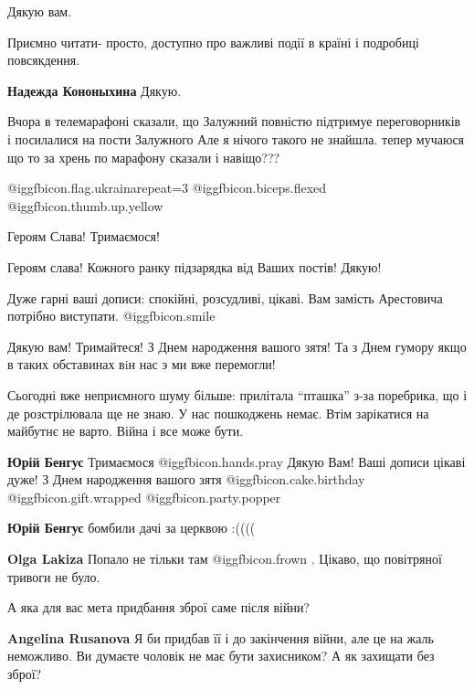 
 
 
 
 
\zzSecCmt

\begin{itemize} %
Дякую вам.

Приємно читати- просто, доступно про важливі події в країні і подробиці повсякдення.

\textbf{Надежда Кононыхина} Дякую.


Вчора в телемарафоні сказали, що Залужний повністю підтримуе переговорників і
посилалися на пости Залужного Але я нічого такого не знайшла. тепер мучаюся що
то за хрень по марафону сказали і навіщо???

@igg{fbicon.flag.ukraina}{repeat=3} @igg{fbicon.biceps.flexed}  @igg{fbicon.thumb.up.yellow} 

Героям Слава! Тримаємося!

Героям слава! Кожного ранку підзарядка від Ваших постів! Дякую!

Дуже гарні ваші дописи: спокійні, розсудливі, цікаві. Вам замість Арестовича
потрібно виступати. @igg{fbicon.smile} 


Дякую вам! Тримайтеся! З Днем народження вашого зятя! Та з Днем гумору якщо в
таких обставинах вiн нас э ми вже перемогли!


Сьогодні вже неприємного шуму більше: прилітала \enquote{пташка} з-за поребрика, що і
де розстрілювала ще не знаю. У нас пошкоджень немає. Втім зарікатися на
майбутнє не варто. Війна і все може бути.

\begin{itemize} %
\textbf{Юрій Бенгус} Тримаємося  @igg{fbicon.hands.pray} Дякую Вам! Ваші дописи цікаві дуже! З Днем народження вашого зятя @igg{fbicon.cake.birthday}  @igg{fbicon.gift.wrapped}  @igg{fbicon.party.popper} 

\textbf{Юрій Бенгус} бомбили дачі за церквою :((((

\textbf{Olga Lakiza} Попало не тільки там  @igg{fbicon.frown}  . Цікаво, що повітряної тривоги не було.
\end{itemize} %

А яка для вас мета придбання зброї саме після війни?

\textbf{Angelina Rusanova} Я би придбав її і до закінчення війни, але це на жаль неможливо. Ви думаєте чоловік не має бути захисником? А як захищати без зброї?

\end{itemize} %
